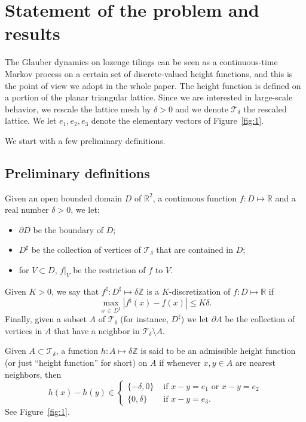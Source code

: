 \documentclass[AHL,Unicode,longabstracts,published]{cedram}
\newcommand{\R}{\mathbb{R}}
\newcommand{\Z}{\mathbb{Z}}
\newcommand{\clT}{\mathcal{T}}
\renewcommand{\d}{{\sharp }}
\begin{document}
\section{Statement of the problem and results}\label{sec:results}
The Glauber dynamics on lozenge tilings can be seen as a continuous-time Markov process on a certain set of discrete-valued height functions, and this is the point of view we adopt in the whole paper. The height function is defined on a portion of the planar triangular lattice. Since we are interested in large-scale behavior, we rescale the lattice mesh by $\delta>0$ and we denote $\clT_\delta$ the rescaled lattice. We let $e_1,e_2,e_3$ denote the elementary vectors of Figure~\ref{fig:1}.

We start with a few preliminary definitions.
\subsection{Preliminary definitions}\label{sec:somenot}
Given an open bounded domain $D$ of $\R^2$, a continuous function $f:D\mapsto \R$ and a real number $\delta>0$, we let:
\begin{itemize}
\item $\partial D$ be the boundary of $D$;
\item $D^{\sharp}$ be the collection of vertices of $\clT_\delta$ that are contained in $D$;
\item for $V\subset D$, $f|_V$ be the restriction of $f$ to $V$.
\end{itemize}

Given $K>0$, we say that $f^{\d}:D^{\d}\mapsto \delta \Z$ is a $K$-discretization of $f:D\mapsto \R$ if
\begin{equation}
\max_{x\,\in\,D^\d}\left|f^\d(x)-f(x)\right|\le K\delta.
\end{equation}
Finally, given a subset $A$ of $\clT_\delta$ (for instance, $D^\d$) we let $\partial A$ be the collection of vertices in $A$ that have a neighbor in $\clT_\delta\setminus A$.

Given $A\subset \clT_\delta$, a function $h:A\mapsto \delta \Z$ is said to be an admissible height function (or just ``height function'' for short) on $A$ if whenever $x,y\in A$ are nearest neighbors, then
\begin{equation}\label{eq:gradients}
h(x)-h(y) \in
\begin{cases}
\{-\delta, 0\} &\text{ if } x-y=e_1 \text{ or } x-y=e_2\\
\{0, \delta\} & \text{ if } x-y=e_3.
\end{cases}
\end{equation}
See Figure~\ref{fig:1}.
\end{document}
